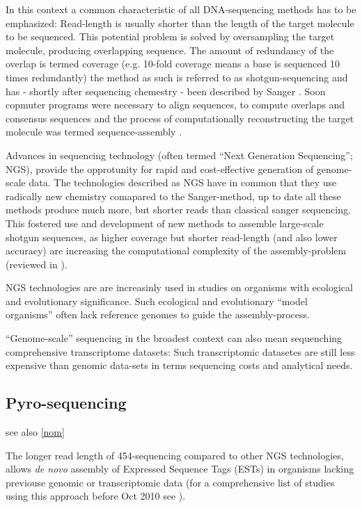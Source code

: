 In this context a common characteristic of all DNA-sequencing methods
has to be emphasized: Read-length is usually shorter than the length
of the target molecule to be sequenced. This potential problem is
solved by oversampling the target molecule, producing overlapping
sequence. The amount of redundancy of the overlap is termed coverage
(e.g. 10-fold coverage means a base is sequenced 10 times redundantly)
the method as such is referred to as shotgun-sequencing and has -
shortly after sequencing chemestry - been described by Sanger
\cite{pmid6260957}. Soon copmuter programs were necessary to align
sequences, to compute overlaps and consensus sequences
\cite{pmid461197} and the process of computationally reconstructing
the target molecule was termed sequence-assembly \cite{pmid6251542}.

Advances in sequencing technology (often termed ``Next Generation
Sequencing''; NGS), provide the opprotunity for rapid and
cost-effective generation of genome-scale data. The technologies
described as NGS have in common that they use radically new chemistry
comapared to the Sanger-method, up to date all these methods produce
much more, but shorter reads than classical sanger sequencing. This
fostered use and development of new methods to assemble large-scale
shotgun sequences, as higher coverage but shorter read-length (and
also lower accuracy) are increasing the computational complexity of
the assembly-problem (reviewed in \cite{pmid20211242}).

NGS technologies are are increasinly used in studies on organisms with
ecological and evolutionary significance. Such ecological and
evolutionary ``model organisms'' often lack reference genomes to guide
the assembly-process.

``Genome-scale'' sequencing in the broadest context can also mean
sequenching comprehensive transcriptome datasets: Such transcriptomic
datasetes are still less expensive than genomic data-sets in terms
sequencing costs and analytical needs.




\subsection{Pyro-sequencing}
\label{pyro-seq}

see also \ref{nom}

The longer read length of 454-sequencing \cite{pmid16056220} compared
to other NGS technologies, allows \textit{de novo} assembly of
Expressed Sequence Tags (ESTs) in organisms lacking previouse genomic
or transcriptomic data (for a comprehensive list of studies using this
approach before Oct 2010 see \cite{pmid20950480}).

